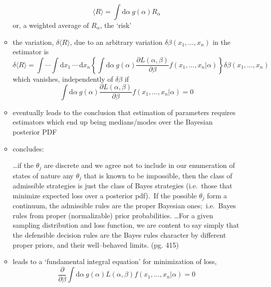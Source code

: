 \documentclass[../jaynes_prob_theory_notes.tex]{subfiles}
\begin{document}
\begin{itemize}
\begin{itemize}
                            \begin{equation*} 
                                \langle R \rangle = \int \text{d}\alpha~g(\alpha)R_{\alpha}
                            \end{equation*}
                            or, a weighted average of \(R_{\alpha}\), the `risk'
                        \item the variation, \(\delta \langle R \rangle\), due to an arbitrary variation \(\delta \beta (x_1, \ldots, x_n)\) in the estimator is
                            \begin{equation*} 
                                \delta \langle R \rangle = \int \cdots \int \text{d}x_1~\cdots~\text{d}x_n \left \{ \int \text{d}\alpha~g(\alpha) \frac{\partial L(\alpha, \beta)}{\partial \beta} f(x_1, \ldots, x_n | \alpha) \right \} \delta \beta (x_1, \ldots, x_n)
                            \end{equation*}
                            which vanishes, independently of \(\delta \beta\) if 
                            \begin{equation*} 
                                \int \text{d}\alpha~g(\alpha) \frac{\partial L(\alpha, \beta)}{\partial \beta} f(x_1, \ldots, x_n | \alpha) = 0
                            \end{equation*}
                        \item eventually leads to the conclusion that estimation of parameters requires estimators which end up being medians/modes over the Bayesian posterior PDF
                        \item concludes:
                            \begin{displayquote}
                                \ldots if the \(\theta_j\) are discrete and we agree not to include in our enumeration of states of nature any \(\theta_j\) that is known to be impossible, then the class of admissible strategies is just the class of Bayes strategies (i.e.\ those that minimize expected loss over a posterior pdf).\ If the possible \(\theta_j\) form a continuum, the admissible rules are the proper Bayesian ones;\ i.e.\ Bayes rules from proper (normalizable) prior probabilities. \ldots For a given sampling distribution and loss function, we are content to say simply that the defensible decision rules are the Bayes rules character by different proper priors, and their well--behaved limits. (pg. 415)
                            \end{displayquote}
                        \item leads to a `fundamental integral equation' for minimization of loss,
                            \begin{equation} 
                                \label{loss_min}
                                \frac{\partial}{\partial \beta} \int \text{d}\alpha~g(\alpha)L(\alpha, \beta)f(x_1, \ldots, x_n | \alpha) = 0
                            \end{equation}
                    \end{itemize}
            \end{itemize}
\end{document}
